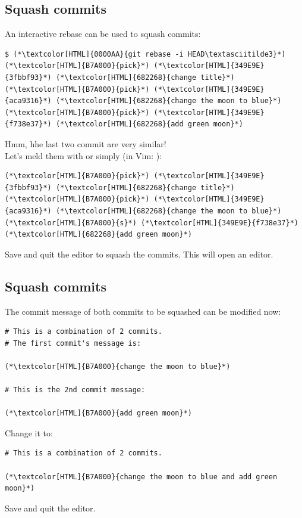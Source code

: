 \subsection{Squash commits}
\begin{frame}[fragile]
  \subslidetitle
  An interactive rebase can be used to squash commits:
  \begin{lstlisting}
$ (*\textcolor[HTML]{0000AA}{git rebase -i HEAD\textasciitilde3}*)
(*\textcolor[HTML]{B7A000}{pick}*) (*\textcolor[HTML]{349E9E}{3fbbf93}*) (*\textcolor[HTML]{682268}{change title}*)
(*\textcolor[HTML]{B7A000}{pick}*) (*\textcolor[HTML]{349E9E}{aca9316}*) (*\textcolor[HTML]{682268}{change the moon to blue}*)
(*\textcolor[HTML]{B7A000}{pick}*) (*\textcolor[HTML]{349E9E}{f738e37}*) (*\textcolor[HTML]{682268}{add green moon}*)
\end{lstlisting}

  Hmm, hhe last two commit are very similar!\\
  Let's meld them with  or simply  (in Vim: ):
  \begin{lstlisting}
(*\textcolor[HTML]{B7A000}{pick}*) (*\textcolor[HTML]{349E9E}{3fbbf93}*) (*\textcolor[HTML]{682268}{change title}*)
(*\textcolor[HTML]{B7A000}{pick}*) (*\textcolor[HTML]{349E9E}{aca9316}*) (*\textcolor[HTML]{682268}{change the moon to blue}*)
(*\textcolor[HTML]{B7A000}{s}*) (*\textcolor[HTML]{349E9E}{f738e37}*) (*\textcolor[HTML]{682268}{add green moon}*)
\end{lstlisting}
  Save and quit the editor to squash the commits. This will open an editor.
\end{frame}

\subsection{Squash commits}
\begin{frame}[fragile]
  \subslidetitle
  The commit message of both commits to be squashed can be modified now:
  \begin{lstlisting}
# This is a combination of 2 commits.
# The first commit's message is:

(*\textcolor[HTML]{B7A000}{change the moon to blue}*)

# This is the 2nd commit message:

(*\textcolor[HTML]{B7A000}{add green moon}*)
\end{lstlisting}

  Change it to:
  \begin{lstlisting}
# This is a combination of 2 commits.

(*\textcolor[HTML]{B7A000}{change the moon to blue and add green moon}*)

\end{lstlisting}
  Save and quit the editor.
\end{frame}

